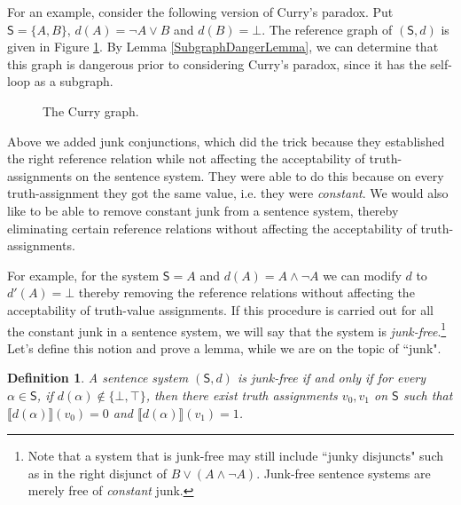 \documentclass[12pt]{kluwer}
\newtheorem{defn}{Definition}
\theoremstyle{remark}
\newcommand{\prg}{\hspace{0.25in}}
\def\S{\textsf{S}}
\begin{document}
For an example, consider the following version of Curry's paradox.  Put $\S = \{A, B\}$, $d(A) = \neg A \vee B$ and $d(B) = \bot$.  The reference graph of $(\S, d)$ is given in Figure \ref{fig:curry}.  By Lemma \ref{SubgraphDangerLemma}, we can determine that this graph is dangerous prior to considering Curry's paradox, since it has the self-loop as a subgraph.
\begin{figure}[ht]
\centering

\caption{The Curry graph.}
\label{fig:curry}
\end{figure}

Above we added junk conjunctions, which did the trick because they established the right reference relation while not affecting the acceptability of truth-assignments on the sentence system. They were able to do this because on every truth-assignment they got the same value, i.e. they were \textit{constant}.  We would also like to be able to remove constant junk from a sentence system, thereby eliminating certain reference relations without affecting the acceptability of truth-assignments. 

\prg For example, for the system $\S = {A}$ and $d(A) = A \wedge \neg A$ we can modify $d$ to $d'(A) = \bot$ thereby removing the reference relations without affecting the acceptability of truth-value assignments. If this procedure is carried out for all the constant junk in a sentence system, we will say that the system is \textit{junk-free}.\footnote{Note that a system that is junk-free may still include ``junky disjuncts" such as in the right disjunct of $B \vee (A \wedge\neg A)$. Junk-free sentence systems are merely free of \textit{constant} junk.}  Let's define this notion and prove a lemma, while we are on the topic of ``junk".

\begin{defn}
A sentence system $(\S, d)$ is \emph{junk-free} if and only if for every $\alpha \in \S$, if $d(\alpha) \not \in \{\bot, \top\}$, then there exist truth assignments $v_0, v_1$ on $\S$ such that $\llbracket d(\alpha)\rrbracket(v_0) = 0$ and  $\llbracket d(\alpha)\rrbracket(v_1) = 1$.
\end{defn}
\end{document}
